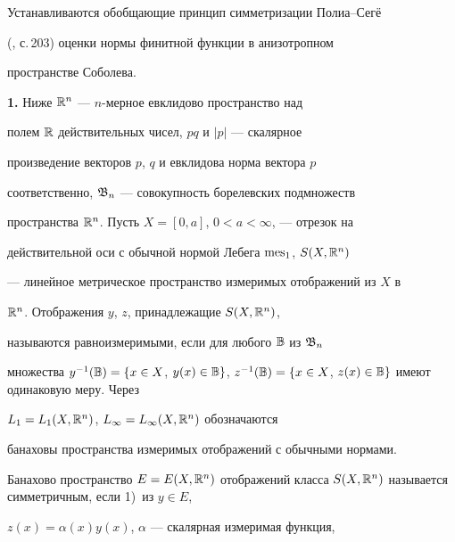 \maketitle 


\label{begin} 


 


 


Устанавливаются обобщающие принцип симметризации Полиа--Сег\"е 


(\cite{1}, с.\,203) оценки нормы финитной функции в анизотропном 


пространстве Соболева. 


\medskip 


 


{\bf 1.} Ниже $\Bbb R^n$ --- $n$-мерное евклидово пространство над 


полем $\Bbb R$ действительных чисел, $p q$ и $|p|$ --- скалярное 


произведение векторов $p$, $q$ и евклидова норма вектора $p$ 


соответственно, $\frak B_n$ --- совокупность борелевских подмножеств 


пространства $\Bbb R^n$. Пусть $X=[0,a]$, $0<a<\infty$, --- отрезок на 


действительной оси с обычной нормой Лебега $\operatorname{mes}_1$, $S(X,\Bbb R^n)$ 


--- линейное метрическое пространство измеримых отображений из $X$ в 


$\Bbb R^n$. Отображения $y$, $z$, принадлежащие $S(X,\Bbb R^n)$, 


называются равноизмеримыми, если для любого $\Bbb B$ из $\frak B_n$ 


множества $y^{-1}(\Bbb B)=\{x\in X$, $y(x)\in\Bbb B\}$, $z^{-1}(\Bbb 


B)=\{x\in X$, $z(x)\in\Bbb B\}$ имеют одинаковую меру. Через 


$L_1=L_1(X,\Bbb R^n)$, $L_\infty=L_\infty(X,\Bbb R^n)$ обозначаются 


банаховы пространства измеримых отображений с обычными нормами. 


 


Банахово пространство $E=E(X,\Bbb R^n)$ отображений класса $S(X,\Bbb 


R^n)$ называется симметричным, если 1)~из $y\in E$, 


$z(x)=\alpha(x)y(x)$, $\alpha$ --- скалярная измеримая функция, 


